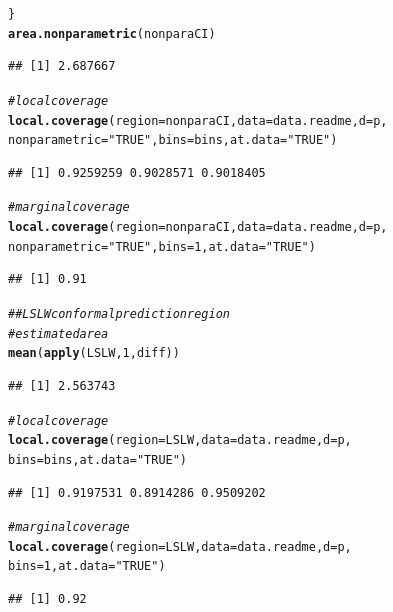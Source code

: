 \documentclass[11pt]{article}\usepackage[]{graphicx}\usepackage[]{color}
\makeatletter
\newcommand{\hlnum}[1]{\textcolor[rgb]{0.686,0.059,0.569}{#1}}%
\newcommand{\hlstr}[1]{\textcolor[rgb]{0.192,0.494,0.8}{#1}}%
\newcommand{\hlcom}[1]{\textcolor[rgb]{0.678,0.584,0.686}{\textit{#1}}}%
\newcommand{\hlstd}[1]{\textcolor[rgb]{0.345,0.345,0.345}{#1}}%
\newcommand{\hlkwc}[1]{\textcolor[rgb]{0.333,0.667,0.333}{#1}}%
\newcommand{\hlkwd}[1]{\textcolor[rgb]{0.737,0.353,0.396}{\textbf{#1}}}%
\newenvironment{kframe}{%
 \def\at@end@of@kframe{}%
 \ifinner\ifhmode%
  \def\at@end@of@kframe{\end{minipage}}%
  \begin{minipage}{\columnwidth}%
 \fi\fi%
 \def\FrameCommand##1{\hskip\@totalleftmargin \hskip-\fboxsep
 \colorbox{shadecolor}{##1}\hskip-\fboxsep
     \hskip-\linewidth \hskip-\@totalleftmargin \hskip\columnwidth}%
 \MakeFramed {\advance\hsize-\width
   \@totalleftmargin\z@ \linewidth\hsize
   \@setminipage}}%
 {\par\unskip\endMakeFramed%
 \at@end@of@kframe}
\newenvironment{knitrout}{}{} %
\makeatother
\begin{document}
\begin{knitrout}
\begin{kframe}
\begin{alltt}
\hlstd{\}}
\hlkwd{area.nonparametric}\hlstd{(nonparaCI)}
\end{alltt}
\begin{verbatim}
## [1] 2.687667
\end{verbatim}
\begin{alltt}
\hlcom{# local coverage}
\hlkwd{local.coverage}\hlstd{(}\hlkwc{region} \hlstd{= nonparaCI,} \hlkwc{data} \hlstd{= data.readme,} \hlkwc{d} \hlstd{= p,}
  \hlkwc{nonparametric} \hlstd{=} \hlstr{"TRUE"}\hlstd{,} \hlkwc{bins} \hlstd{= bins,} \hlkwc{at.data} \hlstd{=} \hlstr{"TRUE"}\hlstd{)}
\end{alltt}
\begin{verbatim}
## [1] 0.9259259 0.9028571 0.9018405
\end{verbatim}
\begin{alltt}
\hlcom{# marginal coverage}
\hlkwd{local.coverage}\hlstd{(}\hlkwc{region} \hlstd{= nonparaCI,} \hlkwc{data} \hlstd{= data.readme,} \hlkwc{d} \hlstd{= p,}
  \hlkwc{nonparametric} \hlstd{=} \hlstr{"TRUE"}\hlstd{,} \hlkwc{bins} \hlstd{=} \hlnum{1}\hlstd{,} \hlkwc{at.data} \hlstd{=} \hlstr{"TRUE"}\hlstd{)}
\end{alltt}
\begin{verbatim}
## [1] 0.91
\end{verbatim}
\begin{alltt}
\hlcom{## LSLW conformal prediction region}
\hlcom{# estimated area}
\hlkwd{mean}\hlstd{(}\hlkwd{apply}\hlstd{(LSLW,} \hlnum{1}\hlstd{, diff))}
\end{alltt}
\begin{verbatim}
## [1] 2.563743
\end{verbatim}
\begin{alltt}
\hlcom{# local coverage}
\hlkwd{local.coverage}\hlstd{(}\hlkwc{region} \hlstd{= LSLW,} \hlkwc{data} \hlstd{= data.readme,} \hlkwc{d} \hlstd{= p,}
  \hlkwc{bins} \hlstd{= bins,} \hlkwc{at.data} \hlstd{=} \hlstr{"TRUE"}\hlstd{)}
\end{alltt}
\begin{verbatim}
## [1] 0.9197531 0.8914286 0.9509202
\end{verbatim}
\begin{alltt}
\hlcom{# marginal coverage}
\hlkwd{local.coverage}\hlstd{(}\hlkwc{region} \hlstd{= LSLW,} \hlkwc{data} \hlstd{= data.readme,} \hlkwc{d} \hlstd{= p,}
  \hlkwc{bins} \hlstd{=} \hlnum{1}\hlstd{,} \hlkwc{at.data} \hlstd{=} \hlstr{"TRUE"}\hlstd{)}
\end{alltt}
\begin{verbatim}
## [1] 0.92
\end{verbatim}

\end{kframe}
\end{knitrout}
\end{document}
